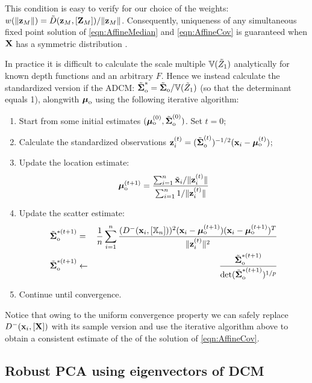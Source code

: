 \vspace{1em}
\noindent This condition is easy to verify for our choice of the weights: $w(\| {\bf{z}}_M \| ) = \tilde D ({\bf{z}}_M, [{\mathbf{Z}}_M]) / \| {\bf{z}}_M \|$. Consequently, uniqueness of any simultaneous fixed point solution of \ref{eqn:AffineMedian} and \ref{eqn:AffineCov} is guaranteed when ${\mathbf{X}}$ has a symmetric distribution \citep{HuberBook81}.

In practice it is difficult to calculate the scale multiple ${\mathbb{V}}(\tilde Z_1)$ analytically for known depth functions and an arbitrary $F$. Hence we instead calculate the standardized version if the ADCM: $\tilde {{\boldsymbol{\Sigma}}}_{\text{o}}^* = \tilde {{\boldsymbol{\Sigma}}}_{\text{o}} / {\mathbb{V}}(\tilde Z_1)$ (so that the determinant equals 1), alongwith ${\boldsymbol{\mu}}_{\text{o}}$ using the following iterative algorithm:

\begin{enumerate}
\item Start from some initial estimates $({\boldsymbol{\mu}}_{\text{o}}^{(0)}, \tilde {{\boldsymbol{\Sigma}}}^{(0)}_{\text{o}})$. Set $t=0$;

\item Calculate the standardized observations ${\bf{z}}_i^{(t)} = (\tilde {{\boldsymbol{\Sigma}}}^{(t)}_{\text{o}})^{-1/2} ({\bf{x}}_i - {\boldsymbol{\mu}}_{\text{o}}^{(t)})$;

\item Update the location estimate:
%
$$
{\boldsymbol{\mu}}_{\text{o}}^{(t+1)} = \frac{\sum_{i=1}^n \tilde {{\bf{x}}}_i / \| {\bf{z}}_i^{(t)} \| }{\sum_{i=1}^n 1 / \| {\bf{z}}_i^{(t)} \|}
$$
%
\item Update the scatter estimate:
%
\begin{eqnarray*}
\tilde {{\boldsymbol{\Sigma}}}_{\text{o}}^{*(t+1)} &=& \frac{1}{n} \sum_{i=1}^n \frac{( D^- ({\bf{x}}_i, [{\mathbb{X}}_n]))^2 ({\bf{x}}_i - {\boldsymbol{\mu}}_{\text{o}}^{(t+1)})({\bf{x}}_i - {\boldsymbol{\mu}}_{\text{o}}^{(t+1)})^T}{\| {\bf{z}}_i^{(t)} \|^2}\\
\tilde {{\boldsymbol{\Sigma}}}_{\text{o}}^{*(t+1)} & \leftarrow & \frac{\tilde {{\boldsymbol{\Sigma}}}_{\text{o}}^{*(t+1)}}{\text{det} (\tilde {{\boldsymbol{\Sigma}}}_{\text{o}}^{*(t+1)})^{1/p}}
\end{eqnarray*}
%
\item Continue until convergence.
\end{enumerate}
%
Notice that owing to the uniform convergence property we can safely replace $D^-({\bf{x}}_i, [{\mathbf{X}}])$ with its sample version and use the iterative algorithm above to obtain a consistent estimate of the of the solution of \ref{eqn:AffineCov}.

\subsection{Robust PCA using eigenvectors of DCM}

